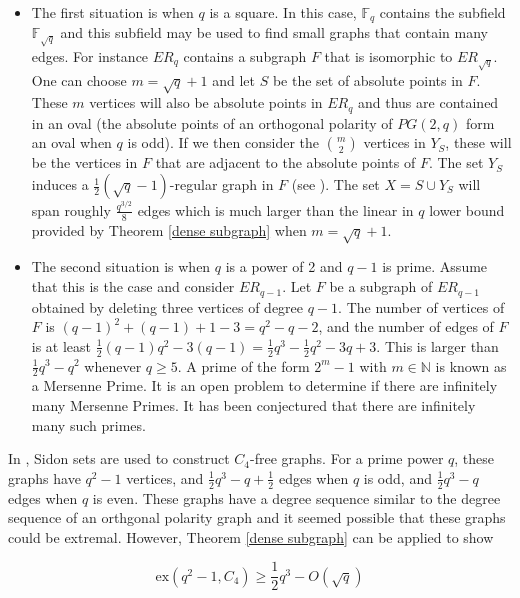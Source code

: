\documentclass[12pt]{article}
\begin{document}
\begin{itemize}
    \item The first situation is when $q$ is a square.  In this case, $\mathbb{F}_{q}$ contains the subfield $\mathbb{F}_{\sqrt{q}}$ and this subfield may be used to find small graphs that contain many edges.  For instance $ER_{q}$ contains a subgraph $F$ that is isomorphic to $ER_{ \sqrt{q} }$.
          One can choose $m = \sqrt{q} + 1$ and let $S$ be the set of absolute points in $F$.  These $m$ vertices will also be absolute points in $ER_q$ and thus are contained in an oval (the absolute points of an orthogonal polarity of $PG(2,q)$ form an oval when $q$ is odd).  If we then consider the $\binom{m}{2}$ vertices in $Y_S$, these will be the vertices in $F$ that are adjacent to the absolute points of $F$.  The set $Y_S$ induces a $\frac{1}{2}(\sqrt{q} -1)$-regular graph in $F$ (see \cite{bs}).
          The set $X = S \cup Y_S$ will span roughly $\frac{q^{3/2}}{8}$ edges which is much larger than the linear in $q$ lower bound provided by Theorem \ref{dense subgraph} when $m  = \sqrt{q} + 1$.

    \item The second situation is when $q$ is a power of 2 and $q  - 1$ is prime.
          Assume that this is the case and consider $ER_{q-1}$.  Let $F$ be a subgraph of
          $ER_{q-1}$ obtained by deleting three vertices of degree $q-1$.  The number of vertices of $F$ is
          $(q - 1)^2 + (q - 1) + 1 - 3 = q^2 - q - 2$, and the number of edges of $F$ is at least
          $\frac{1}{2} (q - 1) q^2 - 3(q  - 1)  = \frac{1}{2}q^3 - \frac{1}{2}q^2 - 3q + 3$.  This is larger than $\frac{1}{2}q^3 - q^2$ whenever $q \geq 5$.  A prime of the form $2^m-1$ with $m \in \mathbb{N}$ is known as a Mersenne Prime.  It is an open problem to determine if there are infinitely many Mersenne Primes.  It has been conjectured that there are infinitely many such primes.
\end{itemize}


In \cite{tt}, Sidon sets are used to construct $C_4$-free graphs.  For a prime power $q$, these graphs have $q^2-1$ vertices, and $\frac{1}{2}q^3 - q + \frac{1}{2}$ edges when $q$ is odd, and $\frac{1}{2}q^3 - q$ edges when $q$ is even.  These graphs have a degree sequence similar to the degree sequence of an orthgonal polarity graph and it seemed possible that these graphs could be extremal.  However, Theorem \ref{dense subgraph} can be applied to show

$$ \mathrm{ex}(q^2-1, C_4) \geq \frac{1}{2}q^3 - O(\sqrt{q}) $$
\end{document}
